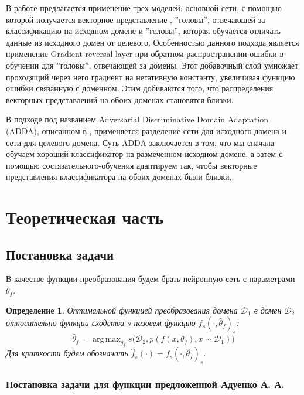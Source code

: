 \documentclass[12pt]{extarticle}
\newtheorem{definition}{Определение}
\DeclareMathOperator*{\argmax}{arg\,max}
\newcommand{\Domain}{\mathcal{D}}
\begin{document}
В работе \cite{DANN} предлагается применение трех моделей: основной сети, с помощью которой получается векторное представление , ''головы'', отвечающей за классификацию на исходном домене и ''головы'', которая обучается отличать данные из исходного домен от целевого. Особенностью данного подхода является применение Gradient reversal layer при обратном распространении ошибки в обучении для ''головы'', отвечающей за домены. Этот добавочный слой умножает проходящий через него градиент на негативную константу, увеличивая функцию ошибки связанную с доменном. Этим добиваются того, что распределения векторных представлений на обоих доменах становятся близки.


В подходе под названием Adversarial Discriminative Domain Adaptation (ADDA), описанном в \cite{ADDA}, применяется разделение сети для исходного домена и сети для целевого домена. Суть ADDA заключается в том, что мы сначала обучаем хороший классификатор на размеченном исходном домене, а затем с помощью состязательного-обучения адаптируем так, чтобы векторные представления классификатора на обоих доменах были близки. 


\section{Теоретическая часть}
\subsection{Постановка задачи}

В качестве функции преобразования будем брать нейронную сеть с параметрами $\theta_f$.
    
\begin{definition}
    \textit{Оптимальной функцией преобразования} домена $\mathcal{D}_1$ в домен $\mathcal{D}_2$ относительно функции сходства $s$ назовем функцию $f_s(\cdot, \hat{\theta}_f)_s$:
    \begin{equation}
        \label{opt_transorm_f}
        \hat{\theta}_f = \argmax_{\theta_f} s\Big( \Domain_2,  p(f(x, \theta_f), x \sim \Domain_1)\Big)
    \end{equation}
Для краткости будем обозначать $\hat{f}_s(\cdot) = f_s(\cdot, \hat{\theta}_f)_s$.
\end{definition}


\subsubsection{Постановка задачи для функции предложенной Адуенко А. А.}
\end{document}
